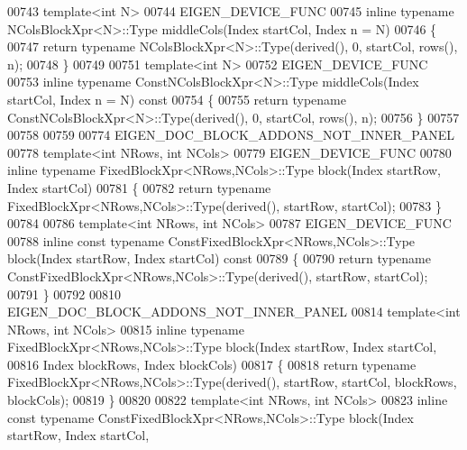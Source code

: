 \begin{DoxyCode}
00743 \textcolor{keyword}{template}<\textcolor{keywordtype}{int} N>
00744 EIGEN\_DEVICE\_FUNC
00745 \textcolor{keyword}{inline} \textcolor{keyword}{typename} NColsBlockXpr<N>::Type middleCols(Index startCol, Index n = N)
00746 \{
00747   \textcolor{keywordflow}{return} \textcolor{keyword}{typename} NColsBlockXpr<N>::Type(derived(), 0, startCol, rows(), n);
00748 \}
00749 
00751 \textcolor{keyword}{template}<\textcolor{keywordtype}{int} N>
00752 EIGEN\_DEVICE\_FUNC
00753 \textcolor{keyword}{inline} \textcolor{keyword}{typename} ConstNColsBlockXpr<N>::Type middleCols(Index startCol, Index n = N)\textcolor{keyword}{ const}
00754 \textcolor{keyword}{}\{
00755   \textcolor{keywordflow}{return} \textcolor{keyword}{typename} ConstNColsBlockXpr<N>::Type(derived(), 0, startCol, rows(), n);
00756 \}
00757 
00758 
00759 
00774 EIGEN\_DOC\_BLOCK\_ADDONS\_NOT\_INNER\_PANEL
00778 \textcolor{keyword}{template}<\textcolor{keywordtype}{int} NRows, \textcolor{keywordtype}{int} NCols>
00779 EIGEN\_DEVICE\_FUNC
00780 \textcolor{keyword}{inline} \textcolor{keyword}{typename} FixedBlockXpr<NRows,NCols>::Type block(Index startRow, Index startCol)
00781 \{
00782   \textcolor{keywordflow}{return} \textcolor{keyword}{typename} FixedBlockXpr<NRows,NCols>::Type(derived(), startRow, startCol);
00783 \}
00784 
00786 \textcolor{keyword}{template}<\textcolor{keywordtype}{int} NRows, \textcolor{keywordtype}{int} NCols>
00787 EIGEN\_DEVICE\_FUNC
00788 \textcolor{keyword}{inline} \textcolor{keyword}{const} \textcolor{keyword}{typename} ConstFixedBlockXpr<NRows,NCols>::Type block(Index startRow, Index startCol)\textcolor{keyword}{ const}
00789 \textcolor{keyword}{}\{
00790   \textcolor{keywordflow}{return} \textcolor{keyword}{typename} ConstFixedBlockXpr<NRows,NCols>::Type(derived(), startRow, startCol);
00791 \}
00792 
00810 EIGEN\_DOC\_BLOCK\_ADDONS\_NOT\_INNER\_PANEL
00814 \textcolor{keyword}{template}<\textcolor{keywordtype}{int} NRows, \textcolor{keywordtype}{int} NCols>
00815 \textcolor{keyword}{inline} \textcolor{keyword}{typename} FixedBlockXpr<NRows,NCols>::Type block(Index startRow, Index startCol,
00816                                                   Index blockRows, Index blockCols)
00817 \{
00818   \textcolor{keywordflow}{return} \textcolor{keyword}{typename} FixedBlockXpr<NRows,NCols>::Type(derived(), startRow, startCol, blockRows, blockCols);
00819 \}
00820 
00822 \textcolor{keyword}{template}<\textcolor{keywordtype}{int} NRows, \textcolor{keywordtype}{int} NCols>
00823 \textcolor{keyword}{inline} \textcolor{keyword}{const} \textcolor{keyword}{typename} ConstFixedBlockXpr<NRows,NCols>::Type block(Index startRow, Index startCol,

\end{DoxyCode}
